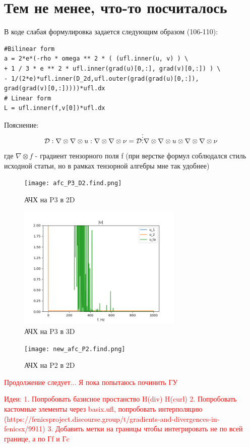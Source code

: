 \documentclass[a4paper,12pt]{article}
\begin{document}
\section{Тем не менее, что-то посчиталось}
В коде слабая формулировка задается следующим образом (106-110):
\begin{lstlisting}
#Bilinear form
a = 2*e*(-rho * omega ** 2 * ( (ufl.inner(u, v) ) \
+ 1 / 3 * e ** 2 * ufl.inner(grad(u)[0,:], grad(v)[0,:]) ) \
- 1/(2*e)*ufl.inner(D_2d,ufl.outer(grad(grad(u)[0,:]),
grad(grad(v)[0,:]))))*ufl.dx
# Linear form
L = ufl.inner(f,v[0])*ufl.dx
\end{lstlisting}

Пояснение: 
\begin{equation}
    \mathcal{D} : \nabla \otimes  \nabla \otimes u : \nabla \otimes \nabla \otimes \nu =\mathcal{D} \Shortstack{. . . .} \nabla \otimes \nabla \otimes u \otimes \nabla \otimes \nabla \otimes \nu 
\end{equation}
где $ \nabla \otimes f$ - градиент тензорного поля f (при верстке формул соблюдался стиль исходной статьи, но в рамках тензорной алгебры мне так удобнее)
\begin{figure}[H]
	\begin{center}
		\texttt{[image: afc\_P3\_D2.find.png]}
		\caption{АЧХ на P3 в 2D}
	\end{center}
\end{figure}

\begin{figure}[H]
	\begin{center}
		\includegraphics[width = 0.7\textwidth]{afc_P3_D3.png}
		\caption{АЧХ на P3 в 3D}
	\end{center}
\end{figure}

\begin{figure}[H]
	\begin{center}
		\texttt{[image: new\_afc\_P2.find.png]}
		\caption{АЧХ на P2 в 2D}
	\end{center}
\end{figure}


\textcolor{red}{Продолжение следует... Я пока попытаюсь починить ГУ}

\par
\textcolor{red}{Идеи:
1. Попробовать базисное простанство H(div) H(curl)
2. Попробовать кастомные элементы через basix.ufl, попробовать интерполяцию (https://fenicsproject.discourse.group/t/gradients-and-divergences-in-fenicsx/9911)
3. Добавить метки на границы чтобы интегрировать не по всей границе, а по Гf и Гc}
\end{document}
